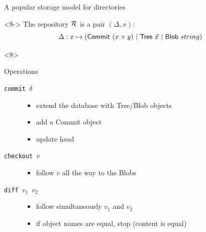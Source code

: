 \documentclass[ignorenonframetext,red]{beamer}
\begin{document}
\begin{frame}{A popular storage model for directories}
\begin{onlyenv}
\begin{center}
    \end{center}
  \end{onlyenv}
  \begin{onlyenv}<8->
    The repository $\mathcal{R}$ is a pair $(\Delta, x)$:
    \[ \Delta : x \mapsto (\mathsf{Commit}\ (x\times y) \gor \mathsf{Tree}\ \vec x
    \gor \mathsf{Blob}\ string)\]
    \begin{overlayarea}{\textwidth}{12em}
      \begin{onlyenv}<8>
        \begin{block}{Operations}
          \begin{description}
          \item[\texttt{commit $\delta$}]
            \begin{itemize}
            \item extend the database with \textsf{Tree}/\textsf{Blob}
              objects
            \item add a \textsf{Commit} object
            \item update head
            \end{itemize}
          \item[\texttt{checkout $v$}]
            \begin{itemize}
            \item follow $v$ all the way to the \textsf{Blob}s
            \end{itemize}
          \item[\texttt{diff $v_1$ $v_2$}]
            \begin{itemize}
            \item follow simultaneously $v_1$ and $v_2$
            \item if object names are equal, stop (content is equal)

\end{itemize}
\end{description}
\end{block}
\end{onlyenv}
\end{overlayarea}
\end{onlyenv}
\end{frame}
\end{document}
